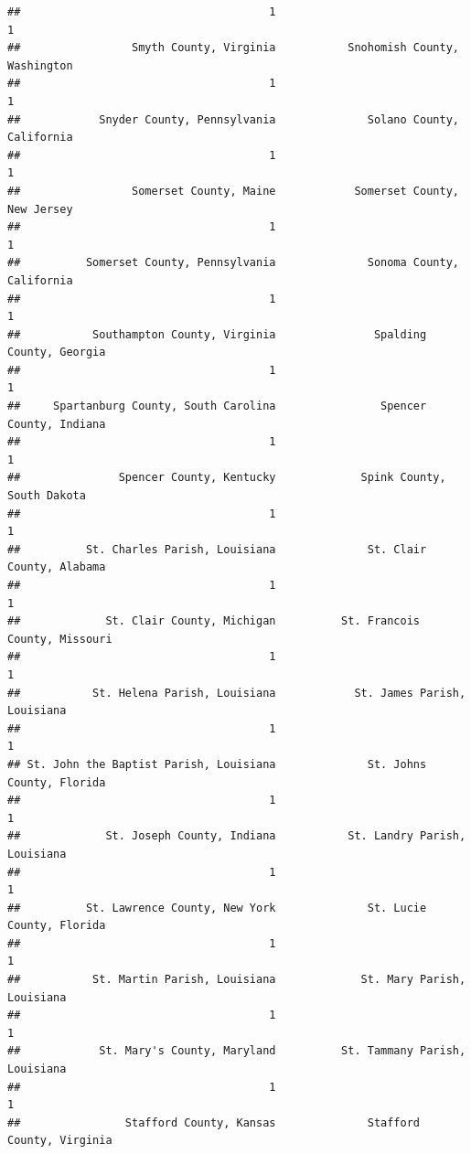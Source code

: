\documentclass[
]{article}
\begin{document}
\begin{verbatim}
##                                      1                                      1 
##                 Smyth County, Virginia           Snohomish County, Washington 
##                                      1                                      1 
##            Snyder County, Pennsylvania              Solano County, California 
##                                      1                                      1 
##                 Somerset County, Maine            Somerset County, New Jersey 
##                                      1                                      1 
##          Somerset County, Pennsylvania              Sonoma County, California 
##                                      1                                      1 
##           Southampton County, Virginia               Spalding County, Georgia 
##                                      1                                      1 
##     Spartanburg County, South Carolina                Spencer County, Indiana 
##                                      1                                      1 
##               Spencer County, Kentucky             Spink County, South Dakota 
##                                      1                                      1 
##          St. Charles Parish, Louisiana              St. Clair County, Alabama 
##                                      1                                      1 
##             St. Clair County, Michigan          St. Francois County, Missouri 
##                                      1                                      1 
##           St. Helena Parish, Louisiana            St. James Parish, Louisiana 
##                                      1                                      1 
## St. John the Baptist Parish, Louisiana              St. Johns County, Florida 
##                                      1                                      1 
##             St. Joseph County, Indiana           St. Landry Parish, Louisiana 
##                                      1                                      1 
##          St. Lawrence County, New York              St. Lucie County, Florida 
##                                      1                                      1 
##           St. Martin Parish, Louisiana             St. Mary Parish, Louisiana 
##                                      1                                      1 
##            St. Mary's County, Maryland          St. Tammany Parish, Louisiana 
##                                      1                                      1 
##                Stafford County, Kansas              Stafford County, Virginia 

\end{verbatim}
\end{document}
